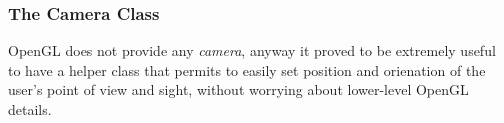 %




%

%
\subsubsection{The Camera Class}
\label{sub:cameraclass}
OpenGL does not provide any \textit{camera}, anyway it proved 
to be extremely useful to have a helper class that permits 
to easily set position and orienation of the user's 
point of view and sight, without worrying about lower-level 
OpenGL details.
%

